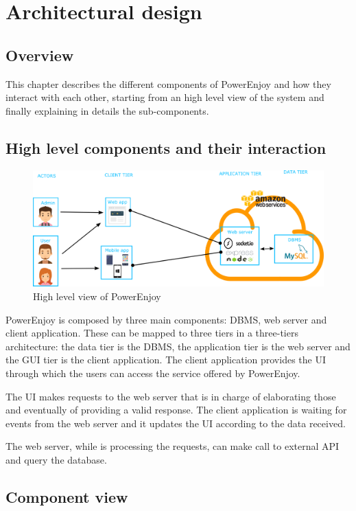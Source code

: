 \chapter{Architectural design}

\section{Overview}
This chapter describes the different components of PowerEnjoy and how they interact with each other, starting from an high level view of the system and finally explaining in details the sub-components.

\section{High level components and their interaction}
\begin{figure}[H]
\includegraphics[width=\textwidth, keepaspectratio]{../images/architectural_design/high_level_view.png}
\caption{High level view of PowerEnjoy}
\end{figure}

PowerEnjoy is composed by three main components: DBMS, web server and client application.
These can be mapped to three tiers in a three-tiers architecture: the data tier is the DBMS, the application tier is the web server and the GUI tier is the client application.
The client application provides the UI through which the users can access the service offered by PowerEnjoy.

The UI makes requests to the web server that is in charge of elaborating those and eventually of providing a valid response.
The client application is waiting for events from the web server and it updates the UI according to the data received.

The web server, while is processing the requests, can make call to external API and query the database.

\section{Component view}


